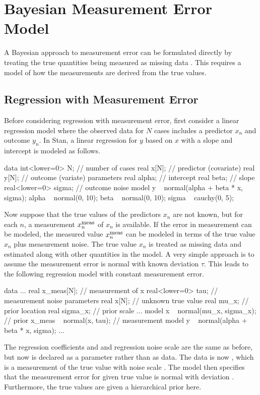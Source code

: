 \section{Bayesian Measurement Error Model}

A Bayesian approach to measurement error can be formulated directly by
treating the true quantities being measured as missing data
\citep{Clayton:1992, RichardsonGilks:1993}.  This requires a model of
how the measurements are derived from the true values.

\subsection{Regression with Measurement Error}

Before considering regression with measurement error, first consider a
linear regression model where the observed data for $N$ cases includes
a predictor $x_n$ and outcome $y_n$.  In Stan, a linear regression for
$y$ based on $x$ with a slope and intercept is modeled as follows.
%
\begin{stancode}
data {
  int<lower=0> N;        // number of cases
  real x[N];             // predictor (covariate)
  real y[N];             // outcome (variate)
}
parameters {
  real alpha;           // intercept
  real beta;            // slope 
  real<lower=0> sigma;  // outcome noise
}
model {
  y ~ normal(alpha + beta * x, sigma);
  alpha ~ normal(0, 10);  
  beta ~ normal(0, 10);
  sigma ~ cauchy(0, 5);
}
\end{stancode}
%

Now suppose that the true values of the predictors $x_n$ are not
known, but for each $n$, a measurement $x^{\mbox{\footnotesize meas}}_n$ of $x_n$ is available.
If the error in measurement can be modeled, the measured value
$x^{\mbox{\footnotesize meas}}_n$ can be modeled in terms of the true value $x_n$ plus measurement
noise.  The true value $x_n$ is treated as missing data and estimated
along with other quantities in the model.  A very simple approach is
to assume the measurement error is normal with known deviation $\tau$.
This leads to the following regression model with constant measurement
error.
%
\begin{stancode}
data {
  ...
  real x_meas[N];     // measurement of x
  real<lower=0> tau;  // measurement noise
}
parameters {
  real x[N];          // unknown true value   
  real mu_x;          // prior location
  real sigma_x;       // prior scale
  ...
}
model {
  x ~ normal(mu_x, sigma_x);  // prior
  x_meas ~ normal(x, tau);    // measurement model
  y ~ normal(alpha + beta * x, sigma);
  ... 
}
\end{stancode}
%
The regression coefficients  and  and
regression noise scale  are the same as before, but now
 is declared as a parameter rather than as data.  The data is
now , which is a measurement of the true  value
with noise scale .  The model then specifies that the
measurement error for  given true value 
is normal with deviation .  Furthermore, the true values
 are given a hierarchical prior here.

